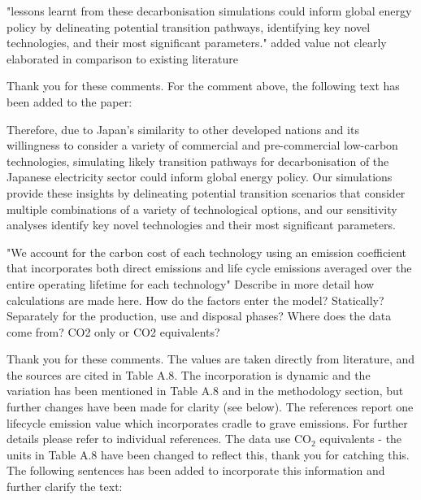 \documentclass[answers,11pt]{exam}
\begin{document}
\begin{questions}
\begin{solution}
        \end{solution}
        

         \question "lessons learnt from these decarbonisation simulations could inform global energy policy by delineating potential transition pathways, identifying key novel technologies, and their most significant parameters."
	added value not clearly elaborated in comparison to existing literature        
        \begin{solution}
                Thank you for these comments. For the comment above, the following text has been added to the paper:
                
                Therefore, due to Japan's similarity to other developed nations and its willingness to consider a variety of commercial and pre-commercial low-carbon technologies, simulating likely transition pathways for decarbonisation of the Japanese electricity sector could inform global energy policy. Our simulations provide these insights by delineating potential transition scenarios that consider multiple combinations of a variety of technological options, and our sensitivity analyses identify key novel technologies and their most significant parameters.
        \end{solution}	
        
        
         \question "We account for the carbon cost of each technology using an emission coefficient that incorporates both direct emissions and life cycle emissions averaged over the entire operating lifetime for each technology"	
         Describe in more detail how calculations are made here. How do the factors enter the model? Statically? Separately for the production, use and disposal phases? Where does the data come from? CO2 only or CO2 equivalents? 
        
        \begin{solution}
                Thank you for these comments. The values are taken directly from literature, and the sources are cited in Table A.8. The incorporation is dynamic and the variation has been mentioned in Table A.8 and in the methodology section, but further changes have been made for clarity (see below). The references report one lifecycle emission value which incorporates cradle to grave emissions. For further details please refer to individual references. The data use CO$_2$ equivalents - the units in Table A.8 have been changed to reflect this, thank you for catching this. The following sentences has been added to incorporate this information and further clarify the text:
                

\end{solution}
\end{questions}
\end{document}
